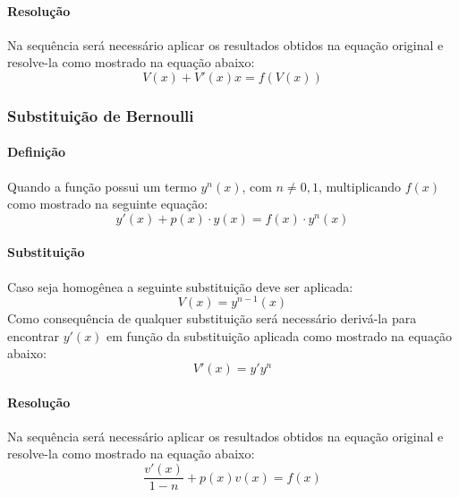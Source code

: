 \documentclass{article}
\begin{document}
                \paragraph{Resolução}Na sequência será necessário aplicar os resultados obtidos na equação original e resolve-la como mostrado na equação abaixo:
                    \begin{equation}
                        \boxed{
                            V(x)+V'(x)x=f(V(x))
                        }
                    \end{equation}

            \subsubsection{Substituição de Bernoulli}
                \paragraph{Definição}Quando a função possui um termo $y^{n}(x)$, com $n\neq 0, 1$, multiplicando $f(x)$ como mostrado na seguinte equação:
                    \begin{equation*}
                        y'(x)+p(x) \cdot y(x)=f(x) \cdot y^{n}(x)
                    \end{equation*}
                \paragraph{Substituição}Caso seja homogênea a seguinte substituição deve ser aplicada:
                    \begin{equation*}
                        \boxed{
                            V(x)=y^{n-1}(x)
                        }
                    \end{equation*}
                Como consequência de qualquer substituição será necessário derivá-la para encontrar $y'(x)$ em função da substituição aplicada como mostrado na equação abaixo:
                    \begin{equation*}
                        V'(x)=y'y^{n}
                    \end{equation*}
                \paragraph{Resolução}Na sequência será necessário aplicar os resultados obtidos na equação original e resolve-la como mostrado na equação abaixo:
                    \begin{equation}
                        \boxed{
                            \frac{v'(x)}{1-n}+p(x)v(x)=f(x)
                        }
                    \end{equation}
\end{document}
